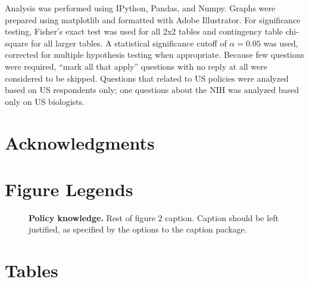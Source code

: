\documentclass[10pt]{article}
\begin{document}
Analysis was performed using IPython\cite{perez_ipython_2007}, Pandas\cite{mckinney_proc-scipy_2010}, and Numpy\cite{van_der_walt_numpy_2011}.
Graphs were prepared using matplotlib\cite{hunter_matplotlib_2007} and formatted with Adobe Illustrator.
For significance testing, Fisher's exact test was used for all 2x2 tables and contingency table chi-square for all larger tables.
A statistical significance cutoff of $\alpha=0.05$ was used, corrected for multiple hypothesis testing when appropriate.
Because few questions were required,  ``mark all that apply'' questions with no reply at all were considered to be skipped.
Questions that related to US policies were analyzed based on US respondents only; one questions about the NIH was analyzed based only on US biologists.

\section*{Acknowledgments}




\section*{Figure Legends}

\begin{figure}[!ht]
\begin{center}
\end{center}
\caption{
{\bf Policy knowledge.}  Rest of figure 2  caption.  Caption 
should be left justified, as specified by the options to the caption 
package.
}
\label{Figure_policy_knowledge}
\end{figure}


\section*{Tables}
\end{document}
